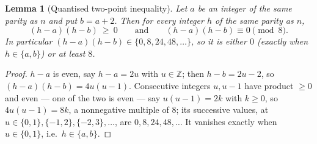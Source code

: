 \documentclass[12pt,a4paper]{article}
\newtheorem{lemma}[theorem]{Lemma}
\theoremstyle{definition}
\begin{document}
\begin{lemma}[Quantised two-point inequality]\label{lem:quant}
Let $a$ be an integer of the same parity as $n$ and put $b=a+2$. Then for
every integer $h$ of the same parity as $n$,
\[
(h-a)(h-b)\ \ge\ 0
\qquad\text{and}\qquad
(h-a)(h-b)\equiv0 \pmod 8 .
\]
In particular $(h-a)(h-b)\in\{0,8,24,48,\ldots\}$, so it is either $0$
(exactly when $h\in\{a,b\}$) or at least $8$.
\end{lemma}
\begin{proof}
$h-a$ is even, say $h-a=2u$ with $u\in\mathbb{Z}$; then $h-b=2u-2$, so
$(h-a)(h-b)=4u(u-1)$. Consecutive integers $u,u-1$ have product $\ge0$ and even --- one of
the two is even --- say $u(u-1)=2k$ with $k\ge0$, so $4u(u-1)=8k$, a
nonnegative multiple of $8$; its successive values, at
$u\in\{0,1\},\{-1,2\},\{-2,3\},\ldots$, are $0,8,24,48,\ldots$ It
vanishes exactly when $u\in\{0,1\}$, i.e.\ $h\in\{a,b\}$.
\end{proof}
\end{document}
